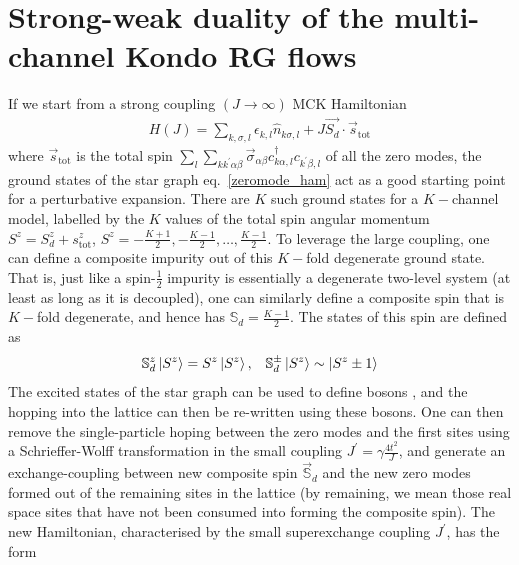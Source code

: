 \documentclass[12pt]{revtex4-2}
\begin{document}
\section{Strong-weak duality of the multi-channel Kondo RG flows}
If we start from a strong coupling \((J \to \infty)\) MCK Hamiltonian
\begin{equation}\begin{aligned}
	\label{strong_ham}
	H(J) = \sum_{k,\sigma,l}\epsilon_{k,l} \hat n_{k\sigma,l} + J \vec{S_d}\cdot\vec{s}_\text{tot}
\end{aligned}\end{equation}
where \(\vec s_\text{tot}\) is the total spin \(\sum_l \sum_{kk^\prime \alpha\beta} \vec \sigma_{\alpha\beta}c^\dagger_{k\alpha,l}c_{k^\prime\beta,l}\) of all the zero modes, the ground states of the star graph eq.~\ref{zeromode_ham} act as a good starting point for a perturbative expansion. There are \(K\) such ground states for a \(K-\)channel model, labelled by the \(K\) values of the total spin angular momentum \(S^z = S_d^z + s_\text{tot}^z\), \(S^z = -\frac{K+1}{2}, -\frac{K-1}{2}, \ldots, \frac{K-1}{2}\). To leverage the large coupling, one can define a composite impurity out of this \(K-\)fold degenerate ground state. That is, just like a spin-\(\frac{1}{2}\) impurity is essentially a degenerate two-level system (at least as long as it is decoupled), one can similarly define a composite spin that is \(K-\)fold degenerate, and hence has \(\mathbb{S}_d = \frac{K-1}{2}\). The states of this spin are defined as
\begin{equation}\begin{aligned}
	\mathbb{S}_d^z \ket{S^z} = S^z \ket{S^z}, &&\mathbb{S}_d^\pm \ket{S^z} \sim \ket{S^z \pm 1}
\end{aligned}\end{equation}
The excited states of the star graph can be used to define bosons \cite{kroha_kolf_2007}, and the hopping into the lattice can then be re-written using these bosons. One can then remove the single-particle hoping between the zero modes and the first sites using a Schrieffer-Wolff transformation in the small coupling \(J^\prime = \gamma \frac{4t^2}{J}\), and generate an exchange-coupling between new composite spin \(\vec {\mathbb{S}}_d\) and the new zero modes formed out of the remaining sites in the lattice \cite{kroha_kolf_2007} (by remaining, we mean those real space sites that have not been consumed into forming the composite spin). The new Hamiltonian, characterised by the small superexchange  coupling \(J^\prime\), has the form
\end{document}
